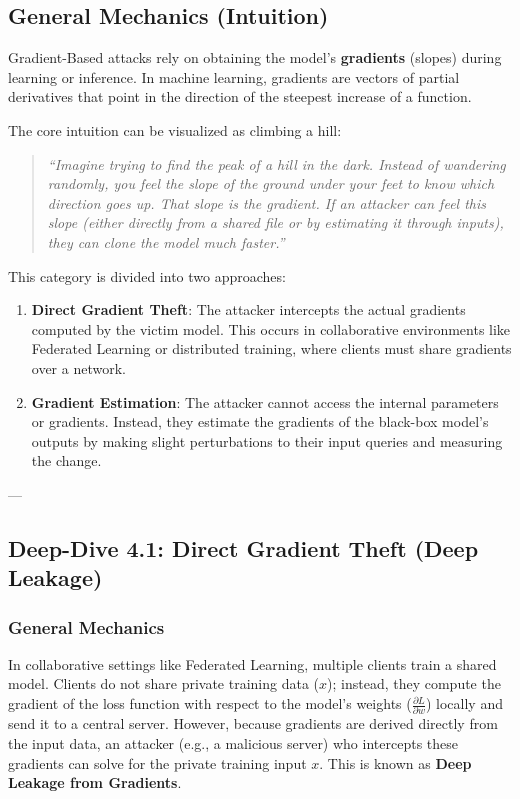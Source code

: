 \documentclass{article}
\begin{document}
\subsection{General Mechanics (Intuition)}
Gradient-Based attacks rely on obtaining the model's \textbf{gradients} (slopes) during learning or inference. In machine learning, gradients are vectors of partial derivatives that point in the direction of the steepest increase of a function. 

The core intuition can be visualized as climbing a hill:
\begin{quote}
    \textit{``Imagine trying to find the peak of a hill in the dark. Instead of wandering randomly, you feel the slope of the ground under your feet to know which direction goes up. That slope is the gradient. If an attacker can feel this slope (either directly from a shared file or by estimating it through inputs), they can clone the model much faster.''}
\end{quote}

This category is divided into two approaches:
\begin{enumerate}
    \item \textbf{Direct Gradient Theft}: The attacker intercepts the actual gradients computed by the victim model. This occurs in collaborative environments like Federated Learning or distributed training, where clients must share gradients over a network.
    \item \textbf{Gradient Estimation}: The attacker cannot access the internal parameters or gradients. Instead, they estimate the gradients of the black-box model's outputs by making slight perturbations to their input queries and measuring the change.
\end{enumerate}

---

\subsection{Deep-Dive 4.1: Direct Gradient Theft (Deep Leakage)}

\subsubsection{General Mechanics}
In collaborative settings like Federated Learning, multiple clients train a shared model. Clients do not share private training data ($x$); instead, they compute the gradient of the loss function with respect to the model's weights ($\frac{\partial L}{\partial w}$) locally and send it to a central server.
However, because gradients are derived directly from the input data, an attacker (e.g., a malicious server) who intercepts these gradients can solve for the private training input $x$. This is known as \textbf{Deep Leakage from Gradients}.
\end{document}
